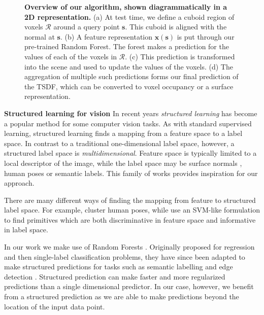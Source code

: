 \documentclass[10pt,twocolumn,letterpaper]{article}
\newcommand{\pixelidx}{\mathbf{s}}
\begin{document}
\begin{figure}
    \caption{\textbf{Overview of our algorithm, shown diagrammatically in a 2D representation.} 
    (a) At test time, we define a cuboid region of voxels $\mathcal{R}$ around a query point $\pixelidx$.
    This cuboid is aligned with the normal at $\pixelidx$.
    (b) A feature representation $\mathbf{x}(\mathbf{s})$ is put through our pre-trained Random Forest.
    The forest makes a prediction for the values of each of the voxels in $\mathcal{R}$.
    (c) This prediction is transformed into the scene and used to update the values of the voxels.
    (d) The aggregation of multiple such predictions forms our final prediction of the TSDF, which can be converted to voxel occupancy or a surface representation.
    }%
    \label{fig:overview}
\end{figure}
\noindent\textbf{Structured learning for vision}
In recent years \emph{structured learning} has become a popular method for some computer vision tasks.
As with standard supervised learning, structured learning finds a mapping from a feature space to a label space.
In contrast to a traditional one-dimensional label space, however, a structured label space is \emph{multidimensional}.
Feature space is typically limited to a local descriptor of the image, while the label space may be surface normals \cite{fouhey-iccv-2013}, human poses \cite{bourdev-iccv-2009} or semantic labels.
This family of works provides inspiration for our approach.

There are many different ways of finding the mapping from feature to structured label space.
For example, \cite{bourdev-iccv-2009} cluster human poses, while \cite{fouhey-iccv-2013} use an SVM-like formulation to find primitives which are both discriminative in feature space and informative in label space.

In our work we make use of Random Forests \cite{breiman-ml-2001}.
Originally proposed for regression and then single-label classification problems, they have since been adapted to make structured predictions for tasks such as semantic labelling \cite{kontschieder-iccv-2011} and edge detection \cite{dollar-iccv-2013}.
Structured prediction can make faster and more regularized predictions than a single dimensional predictor.
In our case, however, we benefit from a structured prediction as we are able to make predictions beyond the location of the input data point.

\end{document}

